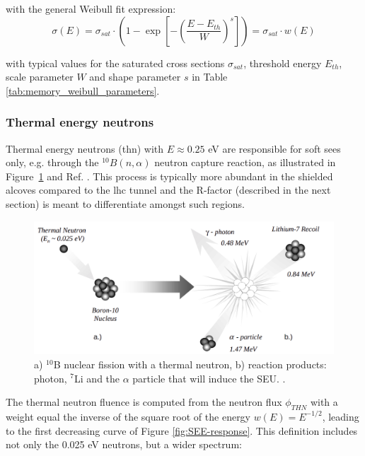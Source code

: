 \documentclass[encoding=utf8,british]{tumphthesis}
\begin{document}
with the general Weibull fit expression:
\begin{equation}
    \sigma(E) = \sigma_{sat} \cdot \left(1 - \exp{\left[- \left( \frac{E-E_{th}}{W} \right)^{s}\right]} \right) = \sigma_{sat} \cdot w(E)
\end{equation}

with typical values for the saturated cross sections $\sigma_{sat}$, threshold energy $E_{th}$, scale parameter $W$ and shape parameter $s$ in Table \ref{tab:memory_weibull_parameters}.




\subsubsection{Thermal energy neutrons}

Thermal energy neutrons (\acrshort{thn}) with $E \approx 0.25$ eV are responsible for soft \acrshort{see}s only, e.g. through the $^{10}B(n,\alpha)$ neutron capture reaction, as illustrated in Figure~\ref{fig:neutron-capture-boron} and Ref. \cite{Baumann:neutron-capture}. This process is typically more abundant in the shielded alcoves compared to the \acrshort{lhc} tunnel and the R-factor (described in the next section) is meant to differentiate amongst such regions.

\begin{figure}[H]
    \centering
    \includegraphics[width=0.9\linewidth]{figures/neutron-capture-boron.jpeg}
    \caption{a) $^{10}$B nuclear fission with a thermal neutron, b) reaction products: photon, $^{7}$Li and the $\alpha$ particle that will induce the SEU. \cite{Baumann:neutron-capture}. }
    \label{fig:neutron-capture-boron}
\end{figure}

The thermal neutron fluence is computed from the neutron flux $\phi_{THN}$ with a weight equal the inverse of the square root of the energy $w(E) = E^{-1/2}$, leading to the first decreasing curve of Figure \ref{fig:SEE-response}. This definition includes not only the 0.025 eV neutrons, but a wider spectrum:
\end{document}
